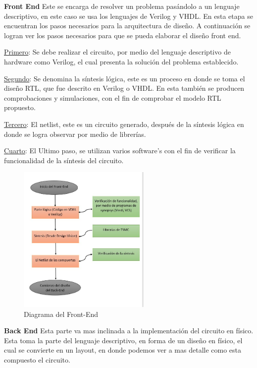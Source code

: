  \textbf{Front End}
 Este se encarga de resolver un problema pasándolo a un lenguaje descriptivo, en este caso se usa los lenguajes de Verilog y VHDL. 
 En esta etapa se encuentran los pasos necesarios para la arquitectura de diseño. A continuación se logran ver los pasos necesarios para que se pueda elaborar el diseño front end.
 
 \underline{Primero}: Se debe realizar el circuito, por medio del lenguaje descriptivo de hardware como Verilog, el cual presenta la solución del problema establecido.
 
 \underline{Segundo}:  Se denomina la síntesis lógica, este es un proceso en donde se toma el diseño RTL, que fue descrito en Verilog o VHDL. En esta también se producen comprobaciones y simulaciones, con el fin de comprobar el modelo RTL propuesto.
 
 \underline{Tercero}: El netlist, este es un circuito generado, después de la síntesis lógica en donde se logra observar  por medio de librerías.
 
 \underline{Cuarto}: El Ultimo paso, se utilizan varios software's con el fin de verificar la funcionalidad de la síntesis del circuito.
 \vspace{80mm}
 \cite{charls} 

 \begin{figure}[t]
    \centering
    \includegraphics[width=0.57\textwidth]{figuras/Font.JPG}
    \caption{Diagrama del Front-End}
    \label{fig:mesh1}
\end{figure}
 
 
 
 
 
  \textbf{Back End} 
Esta parte va mas inclinada a la implementación del circuito en físico. Esta toma la parte del lenguaje descriptivo, en forma de un diseño en físico, el cual se convierte en un layout, en donde podemos ver a mas detalle como esta compuesto el circuito.


